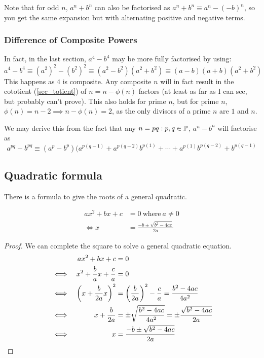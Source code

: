 Note that for odd \(n\), \(a^n + b^n\) can also be factorised as
\(a^n + b^n \equiv a^n - (-b)^n\), so you get the same expansion but with
alternating positive and negative terms.


\subsubsection{Difference of Composite Powers}

In fact, in the last section, \(a^4 - b^4\) may be more fully factorised by
using:
\begin{equation*}
a^4 - b^4 \equiv (a^2)^2 - (b^2)^2 \equiv (a^2 - b^2)(a^2 + b^2) \equiv
    (a - b)(a + b)(a^2 + b^2)
\end{equation*}
This happens as \(4\) is composite. Any composite \(n\) will in fact result
in the cototient (\ref{sec_totient}) of \(n = n - \phi(n)\) factors (at
least as far as I can see, but probably can't prove). This
also holds for prime \(n\), but for prime \(n\),
\(\phi(n) = n - 2 \implies n - \phi(n) = 2\), as the only divisors of
a prime \(n\) are \(1\) and \(n\).

We may derive this from the fact that any \(n = pq: p, q \in \mathbb P\),
\(a^n - b^n\) will factorise as
\begin{equation}
a^{pq} - b^{pq} \equiv
 (a^p - b^p)(a^{p(q - 1)} + a^{p(q - 2)}b^{p(1)} + \dotsb +
             a^{p(1)}b^{p(q - 2)} + b^{p(q - 1)}
\end{equation}

\subsection{Quadratic formula} \label{sec_quad_formula}

There is a formula to give the roots of a general quadratic.
\begin{theorem}
\begin{align*}
ax^2 + bx + c &= 0\ \text{where}\ a \neq 0 \\
\iff x &= \frac{-b \pm \sqrt{b^2 - 4ac}}{2a}
\end{align*}
\end{theorem}
\begin{proof}
We can complete the square to solve a general quadratic equation.
\begin{alignat*}{2}
&&ax^2 + bx + c &= 0 \\
&\iff& x^2 + \frac{b}{a}x + \frac{c}{a} &= 0 \\
&\iff& \pqty{x + \frac{b}{2a}x}^2 &= \pqty{\frac{b}{2a}}^2 - \frac{c}{a}
    = \frac{b^2 - 4ac}{4a^2} \\
&\iff& x + \frac{b}{2a} &= \pm \sqrt{\frac{b^2 - 4ac}{4a^2}}
    = \pm \frac{\sqrt{b^2 - 4ac}}{2a} \\
&\iff& x &= \frac{-b \pm \sqrt{b^2 - 4ac}}{2a} \tag*{\qedhere}
\end{alignat*}
\end{proof}

